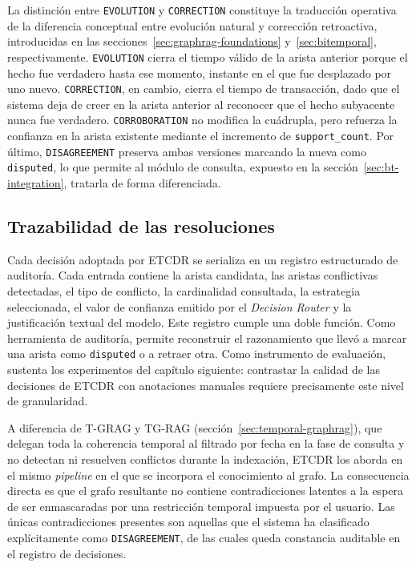 La distinción entre \texttt{EVOLUTION} y \texttt{CORRECTION} constituye la traducción operativa de la diferencia conceptual entre evolución natural y corrección retroactiva, introducidas en las secciones~\ref{sec:graphrag-foundations} y~\ref{sec:bitemporal}, respectivamente. \texttt{EVOLUTION} cierra el tiempo válido de la arista anterior porque el hecho fue verdadero hasta ese momento, instante en el que fue desplazado por uno nuevo. \texttt{CORRECTION}, en cambio, cierra el tiempo de transacción, dado que el sistema deja de creer en la arista anterior al reconocer que el hecho subyacente nunca fue verdadero. \texttt{CORROBORATION} no modifica la cuádrupla, pero refuerza la confianza en la arista existente mediante el incremento de \texttt{support\_count}. Por último, \texttt{DISAGREEMENT} preserva ambas versiones marcando la nueva como \texttt{disputed}, lo que permite al módulo de consulta, expuesto en la sección~\ref{sec:bt-integration}, tratarla de forma diferenciada.

\subsection{Trazabilidad de las resoluciones}

Cada decisión adoptada por ETCDR se serializa en un registro estructurado de auditoría. Cada entrada contiene la arista candidata, las aristas conflictivas detectadas, el tipo de conflicto, la cardinalidad consultada, la estrategia seleccionada, el valor de confianza emitido por el \emph{Decision Router} y la justificación textual del modelo. Este registro cumple una doble función. Como herramienta de auditoría, permite reconstruir el razonamiento que llevó a marcar una arista como \texttt{disputed} o a retraer otra. Como instrumento de evaluación, sustenta los experimentos del capítulo siguiente: contrastar la calidad de las decisiones de ETCDR con anotaciones manuales requiere precisamente este nivel de granularidad.

A diferencia de T-GRAG y TG-RAG (sección~\ref{sec:temporal-graphrag}), que delegan toda la coherencia temporal al filtrado por fecha en la fase de consulta y no detectan ni resuelven conflictos durante la indexación, ETCDR los aborda en el mismo \emph{pipeline} en el que se incorpora el conocimiento al grafo. La consecuencia directa es que el grafo resultante no contiene contradicciones latentes a la espera de ser enmascaradas por una restricción temporal impuesta por el usuario. Las únicas contradicciones presentes son aquellas que el sistema ha clasificado explícitamente como \texttt{DISAGREEMENT}, de las cuales queda constancia auditable en el registro de decisiones.

